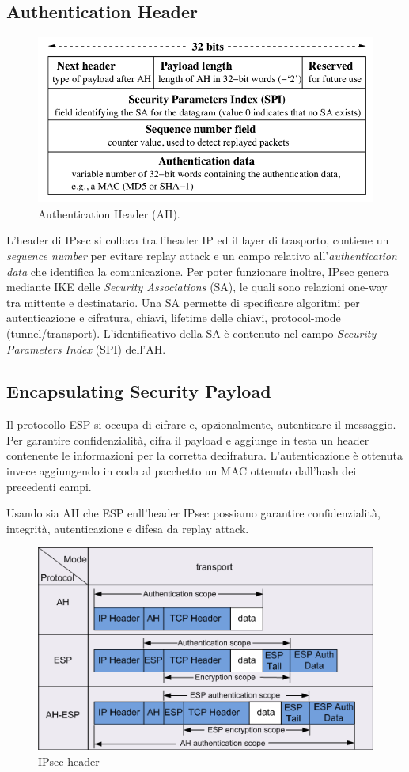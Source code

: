 \documentclass[a4paper, 11pt, notitlepage, fleqn]{report}
\begin{document}
\subsection{Authentication Header}
\begin{figure}[htp]
	\centering
	\includegraphics[width=.8\textwidth]{images/AH}
	\caption{Authentication Header (AH).}
\end{figure}
L'header di IPsec si colloca tra l'header IP ed il layer di trasporto, contiene un \emph{sequence number} per evitare replay attack e un campo relativo all'\emph{authentication data} che identifica la comunicazione. Per poter funzionare inoltre, IPsec genera mediante IKE delle \emph{Security Associations} (SA), le quali sono relazioni one-way tra mittente e destinatario. Una SA permette di specificare algoritmi per autenticazione e cifratura, chiavi, lifetime delle chiavi, protocol-mode (tunnel/transport). L'identificativo della SA è contenuto nel campo \emph{Security Parameters Index} (SPI) dell'AH.

\subsection{Encapsulating Security Payload}
Il protocollo ESP si occupa di cifrare e, opzionalmente, autenticare il messaggio. Per garantire confidenzialità, cifra il payload e aggiunge in testa un header contenente le informazioni per la corretta decifratura. L'autenticazione è ottenuta invece aggiungendo in coda al pacchetto un MAC ottenuto dall'hash dei precedenti campi.

Usando sia AH che ESP enll'header IPsec possiamo garantire confidenzialità, integrità, autenticazione e difesa da replay attack.
\begin{figure}[htp]
	\centering
	\includegraphics[width=.95\textwidth]{images/IPsecHeader}
	\caption{IPsec header}
\end{figure}
\end{document}

